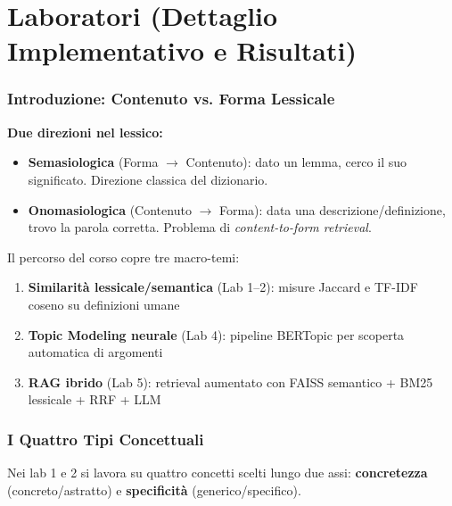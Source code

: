 \documentclass[12pt,a4paper]{article}
\begin{document}
\part{Laboratori (Dettaglio Implementativo e Risultati)}

\section{Introduzione: Contenuto vs. Forma Lessicale}

\begin{defbox}
\textbf{Due direzioni nel lessico:}
\begin{itemize}
  \item \textbf{Semasiologica} (Forma $\to$ Contenuto): dato un lemma, cerco il suo significato. Direzione classica del dizionario.
  \item \textbf{Onomasiologica} (Contenuto $\to$ Forma): data una descrizione/definizione, trovo la parola corretta. Problema di \emph{content-to-form retrieval}.
\end{itemize}
\end{defbox}

\medskip
Il percorso del corso copre tre macro-temi:
\begin{enumerate}
  \item \textbf{Similarit\`a lessicale/semantica} (Lab 1--2): misure Jaccard e TF-IDF coseno su definizioni umane
  \item \textbf{Topic Modeling neurale} (Lab 4): pipeline BERTopic per scoperta automatica di argomenti
  \item \textbf{RAG ibrido} (Lab 5): retrieval aumentato con FAISS semantico + BM25 lessicale + RRF + LLM
\end{enumerate}

\section{I Quattro Tipi Concettuali}

Nei lab 1 e 2 si lavora su quattro concetti scelti lungo due assi: \textbf{concretezza} (concreto/astratto) e \textbf{specificit\`a} (generico/specifico).
\end{document}
